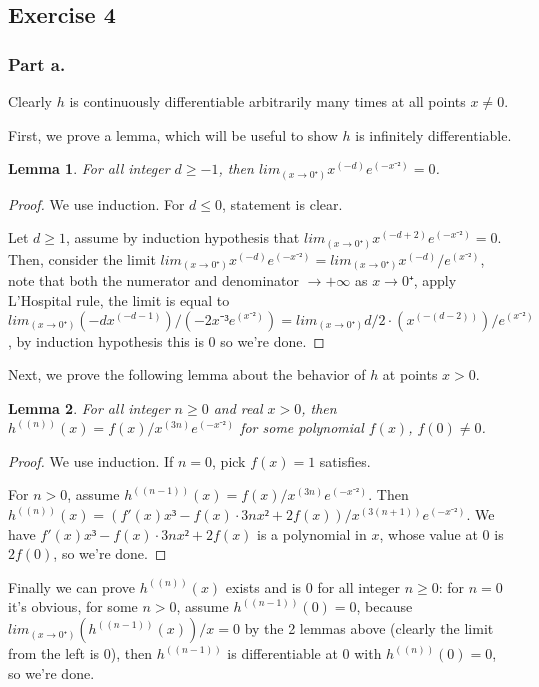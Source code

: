 \documentclass{article}
\newtheorem{lemma}{Lemma}
\begin{document}
\subsection{Exercise 4}%
\typstmathinputenable{\$}

\subsubsection{Part a.}
Clearly $h$ is continuously differentiable arbitrarily many times at all points $x ≠ 0$.

First, we prove a lemma, which will be useful to show $h$ is infinitely differentiable.
\begin{lemma}
    For all integer $d ≥ -1$, then $lim_(x → 0⁺) x^(-d) e^(-x⁻²) =0$.
\end{lemma}
\begin{proof}
    We use induction. For $d ≤ 0$, statement is clear.

    Let $d ≥ 1$, assume by induction hypothesis that $lim_(x → 0⁺) x^(-d+2) e^(-x⁻²) =0$.
    Then, consider the limit $lim_(x → 0⁺) x^(-d) e^(-x⁻²)=lim_(x → 0⁺) x^(-d)/e^(x⁻²)$, note that both the numerator and denominator $→ +∞$ as $x → 0⁺$, apply L'Hospital rule, the limit is equal to $lim_(x → 0⁺) (-d x^(-d-1))/(-2 x⁻³ e^(x⁻²)) = lim_(x → 0⁺) d/2 ⋅ (x^(-(d-2)))/e^(x⁻²)$, by induction hypothesis this is $0$ so we're done.
\end{proof}

Next, we prove the following lemma about the behavior of $h$ at points $x>0$.
\begin{lemma}
    For all integer $n ≥ 0$ and real $x>0$, then $h^((n))(x)=f(x)/x^(3n) e^(-x⁻²)$ for some polynomial $f(x)$, $f(0) ≠ 0$.
\end{lemma}
\begin{proof}
We use induction. If $n=0$, pick $f(x)=1$ satisfies.

For $n>0$, assume $h^((n-1))(x) = f(x)/x^(3n) e^(-x⁻²)$. Then
$h^((n))(x) = (
f'(x) x³-f(x) ⋅ 3n x² + 2f(x)
)/x^(3(n+1)) e^(-x⁻²)$.
We have
$f'(x) x³-f(x) ⋅ 3n x² + 2f(x)$ is a polynomial in $x$, whose value at $0$ is $2 f(0)$, so we're done.
\end{proof}


Finally we can prove $h^((n))(x)$ exists and is $0$ for all integer $n ≥ 0$: for $n=0$ it's obvious, for some $n>0$, assume $h^((n-1))(0)=0$, because $lim_(x → 0⁺) (h^((n-1))(x))/x = 0$ by the 2 lemmas above (clearly the limit from the left is $0$), then $h^((n-1))$ is differentiable at $0$ with $h^((n))(0)=0$, so we're done.
\end{document}

